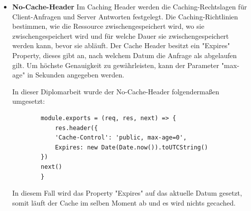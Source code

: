 \begin{itemize}
        \cite{Helmet}
    \item \textbf{No-Cache-Header}
        \newline
        Im Caching Header werden die Caching-Rechtslagen für Client-Anfragen und Server Antworten festgelegt. Die Caching-Richtlinien bestimmen, wie die Ressource zwischengespeichert wird, wo sie zwischengespeichert wird und für welche Dauer sie zwischengespeichert werden kann, bevor sie abläuft. Der Cache Header besitzt ein "Expires" Property, dieses gibt an, nach welchem Datum die Anfrage als abgelaufen gilt. Um höchste Genauigkeit zu gewährleisten, kann der Parameter "max-age" in Sekunden angegeben werden.

        In dieser Diplomarbeit wurde der No-Cache-Header folgendermaßen umgesetzt:

        \begin{lstlisting}
        module.exports = (req, res, next) => {
            res.header({
            'Cache-Control': 'public, max-age=0',
            Expires: new Date(Date.now()).toUTCString()
        })
        next()
        }
        \end{lstlisting}

        In diesem Fall wird das Property "Expires" auf das aktuelle Datum gesetzt, somit läuft der Cache im selben Moment ab und es wird nichts gecached.


        \cite{No_Cache_Header}
        
\end{itemize}